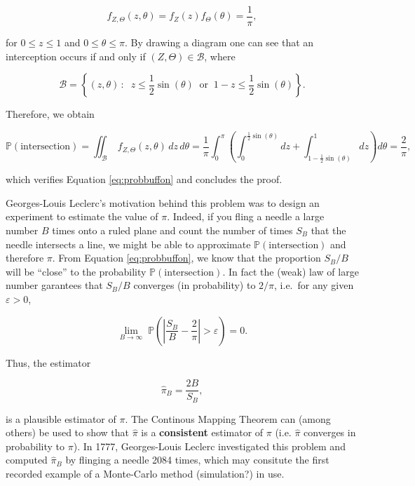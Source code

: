 \documentclass[12pt,]{krantz}
\begin{document}
\[
f_{Z, \Theta} (z, \theta) = f_{Z} (z) f_{\Theta} (\theta) = \frac{1}{\pi},
\]

for \(0 \leq z \leq 1\) and \(0 \leq \theta \leq \pi\). By drawing a
diagram one can see that an interception occurs if and only if
\((Z, \Theta) \in \mathcal{B}\), where

\[
\mathcal{B} = \left\{(z, \theta)\,: \;\; z \leq \frac{1}{2} \sin (\theta)  \;\; \text{or} \;\; 1-z \leq \frac{1}{2} \sin(\theta)\right\}.
\]

Therefore, we obtain

\[
\mathbb{P}(\text{intersection}) = \iint_\mathcal{B} \; f_{Z, \Theta} (z, \theta)\, dz \, d\theta = \frac{1}{\pi} \int_0^\pi \left(\int_0^{\frac{1}{2}\sin(\theta)} dz + \int_{1 - \frac{1}{2}\sin(\theta)}^{1} dz \right) d\theta = \frac{2}{\pi},
\]

which verifies Equation \eqref{eq:probbuffon} and concludes the proof.

\newline

Georges-Louis Leclerc's motivation behind this problem was to design an
experiment to estimate the value of \(\pi\). Indeed, if you fling a
needle a large number \(B\) times onto a ruled plane and count the
number of times \(S_B\) that the needle intersects a line, we might be
able to approximate \(\mathbb{P}(\text{intersection})\) and therefore
\(\pi\). From Equation \eqref{eq:probbuffon}, we know that the proportion
\(S_B/B\) will be ``close'' to the probability
\(\mathbb{P}(\text{intersection})\). In fact the (weak) law of large
number garantees that \(S_B/B\) converges (in probability) to \(2/\pi\),
i.e.~for any given \(\varepsilon > 0\),

\[
\lim_{B \rightarrow \infty} \; \mathbb{P}\left( \left| \frac{S_B}{B} - \frac{2}{\pi} \right|  > \varepsilon \right) = 0.
\]

Thus, the estimator

\[
\hat{\pi}_B = \frac{2B}{S_B},
\]

is a plausible estimator of \(\pi\). The Continous Mapping Theorem
\citep[see e.g.~Theorem 1.14 of][]{dasgupta2008asymptotic} can (among
others) be used to show that \(\hat{\pi}\) is a \textbf{consistent}
estimator of \(\pi\) (i.e. \(\hat{\pi}\) converges in probability to
\(\pi\)). In 1777, Georges-Louis Leclerc investigated this problem and
computed \(\hat{\pi}_B\) by flinging a needle 2084 times, which may
consitute the first recorded example of a Monte-Carlo method
(simulation?) in use.
\end{document}
